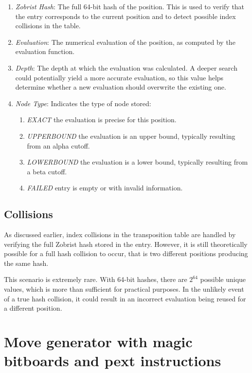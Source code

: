 \begin{enumerate}
  \item \textit{Zobrist Hash}: The full 64-bit hash of the position. This is used to verify that the entry corresponds to the current position and to detect possible index collisions in the table.
  \item \textit{Evaluation}: The numerical evaluation of the position, as computed by the evaluation function.
  \item \textit{Depth}: The depth at which the evaluation was calculated. A deeper search could potentially yield a more accurate evaluation, so this value helps determine whether a new evaluation should overwrite the existing one.
  \item \textit{Node Type}: Indicates the type of node stored:
  \begin{enumerate}
    \item \textit{EXACT} the evaluation is precise for this position.
    \item \textit{UPPERBOUND} the evaluation is an upper bound, typically resulting from an alpha cutoff.
    \item \textit{LOWERBOUND} the evaluation is a lower bound, typically resulting from a beta cutoff.
    \item \textit{FAILED} entry is empty or with invalid information.
  \end{enumerate}
\end{enumerate}

\subsection*{Collisions}

As discussed earlier, index collisions in the transposition table are handled by verifying the full Zobrist hash stored in the entry. However, it is still theoretically possible for a full hash collision to occur, that is two different positions producing the same hash.

\vspace{1em}

\noindent This scenario is extremely rare. With 64-bit hashes, there are $2^{64}$ possible unique values, which is more than sufficient for practical purposes. In the unlikely event of a true hash collision, it could result in an incorrect evaluation being reused for a different position.

\section{Move generator with magic bitboards and pext instructions}

